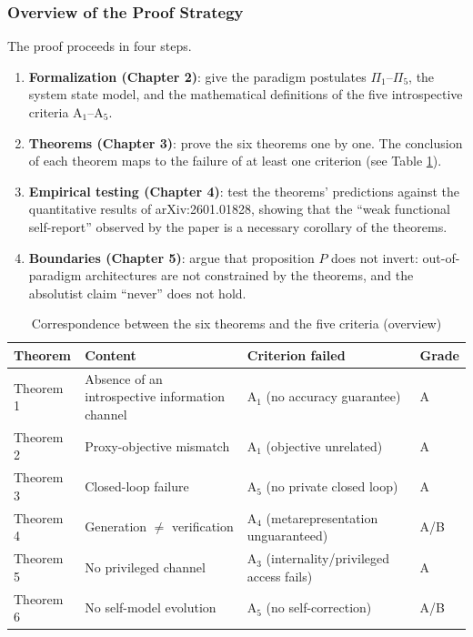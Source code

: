 \subsubsection{Overview of the Proof Strategy}

The proof proceeds in four steps.

\begin{enumerate}
\item \textbf{Formalization (Chapter 2)}: give the paradigm postulates $\Pi_1$--$\Pi_5$, the
system state model, and the mathematical definitions of the five introspective criteria
$\mathrm{A}_1$--$\mathrm{A}_5$.
\item \textbf{Theorems (Chapter 3)}: prove the six theorems one by one. The conclusion of each
theorem maps to the failure of at least one criterion (see Table \ref{tab:thm-criteria}).
\item \textbf{Empirical testing (Chapter 4)}: test the theorems' predictions against the
quantitative results of arXiv:2601.01828, showing that the ``weak functional self-report''
observed by the paper is a necessary corollary of the theorems.
\item \textbf{Boundaries (Chapter 5)}: argue that proposition $P$ does not invert:
out-of-paradigm architectures are not constrained by the theorems, and the absolutist claim
``never'' does not hold.
\end{enumerate}

\begin{table}[htbp]
\centering
\caption{Correspondence between the six theorems and the five criteria (overview)
\label{tab:thm-criteria}}
\begin{tabular}{p{2.0cm}p{5.4cm}p{5.4cm}p{1.4cm}}
\toprule
Theorem & Content & Criterion failed & Grade \\
\midrule
Theorem 1 & Absence of an introspective information channel & $\mathrm{A}_1$ (no accuracy guarantee) & A \\
Theorem 2 & Proxy-objective mismatch & $\mathrm{A}_1$ (objective unrelated) & A \\
Theorem 3 & Closed-loop failure & $\mathrm{A}_5$ (no private closed loop) & A \\
Theorem 4 & Generation $\neq$ verification & $\mathrm{A}_4$ (metarepresentation unguaranteed) & A/B \\
Theorem 5 & No privileged channel & $\mathrm{A}_3$ (internality/privileged access fails) & A \\
Theorem 6 & No self-model evolution & $\mathrm{A}_5$ (no self-correction) & A/B \\
\bottomrule
\end{tabular}
\end{table}


